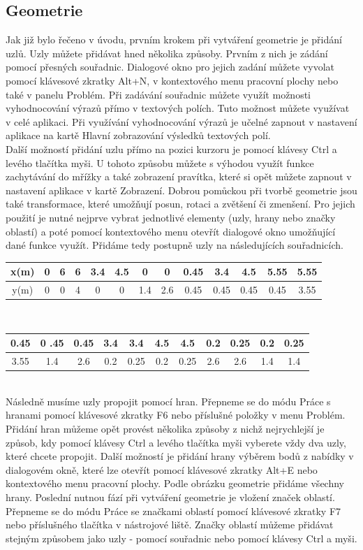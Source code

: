 \documentclass[a4paper, oneside]{article}
\begin{document}
\subsection{Geometrie}
Jak již bylo řečeno v úvodu, prvním krokem při vytváření geometrie je přidání uzlů. Uzly můžete přidávat hned několika způsoby. Prvním z nich je zádání pomocí přesných souřadnic. Dialogové okno pro jejich zadání můžete vyvolat pomocí klávesové zkratky Alt+N, v kontextového menu pracovní plochy nebo také v panelu Problém. Při zadávání souřadnic můžete využít možnosti vyhodnocování výrazů přímo v textových polích. Tuto možnost můžete využívat v celé aplikaci. Při využívání vyhodnocování výrazů je učelné zapnout v nastavení aplikace na kartě Hlavní zobrazování výsledků textových polí.\\
Další možností přidání uzlu přímo na pozici kurzoru je pomocí klávesy Ctrl a levého tlačítka myši. U tohoto způsobu můžete s výhodou využít funkce zachytávání do mřížky a také zobrazení pravítka, které si opět můžete zapnout v nastavení aplikace v kartě Zobrazení. Dobrou pomůckou při tvorbě geometrie jsou také transformace, které umožňují posun, rotaci a zvětšení či zmenšení. Pro jejich použití je nutné nejprve vybrat jednotlivé elementy (uzly, hrany nebo značky oblastí) a poté pomocí kontextového menu otevřít dialogové okno umožňující dané funkce využít. Přidáme tedy postupně uzly na následujících souřadnicích.\\
\begin{tabular}{|c|c|c|c|c|c|c|c|c|c|c|c|c|}
\hline
x(m) & 0 & 6 & 6 & 3.4 & 4.5 & 0 & 0 & 0.45 & 3.4 & 4.5 & 5.55 & 5.55\\
\hline
y(m) & 0 & 0 & 4 & 0 & 0 & 1.4 & 2.6 & 0.45 & 0.45 & 0.45 & 0.45 & 3.55\\
\hline 
\end{tabular} \\
\begin{tabular}{|c|c|c|c|c|c|c|c|c|c|c|}
\hline
 0.45 &0 .45 & 0.45 & 3.4 & 3.4 & 4.5 & 4.5 & 0.2 & 0.25 & 0.2 & 0.25\\
\hline
 3.55 & 1.4 & 2.6 & 0.2 & 0.25 & 0.2 & 0.25 & 2.6 & 2.6 & 1.4 & 1.4\\
\hline 
\end{tabular} \\
Následně musíme uzly propojit pomocí hran. Přepneme se do módu Práce s hranami pomocí klávesové zkratky F6 nebo příslušné položky v menu Problém. Přidání hran můžeme opět provést několika způsoby z nichž nejrychlejší je způsob, kdy pomocí klávesy Ctrl a levého tlačítka myši vyberete vždy dva uzly, které chcete propojit. Další možností je přidání hrany výběrem bodů z nabídky v dialogovém okně, které lze otevřít pomocí klávesové zkratky Alt+E nebo kontextového menu pracovní plochy. Podle obrázku geometrie přidáme všechny hrany. Poslední nutnou fází při vytváření geometrie je vložení značek oblastí. Přepneme se do módu Práce se značkami oblastí pomocí klávesové zkratky F7 nebo příslušného tlačítka v nástrojové liště. Značky oblastí můžeme přidávat stejným způsobem jako uzly - pomocí souřadnic nebo pomocí klávesy Ctrl a myši.\\
\end{document}
